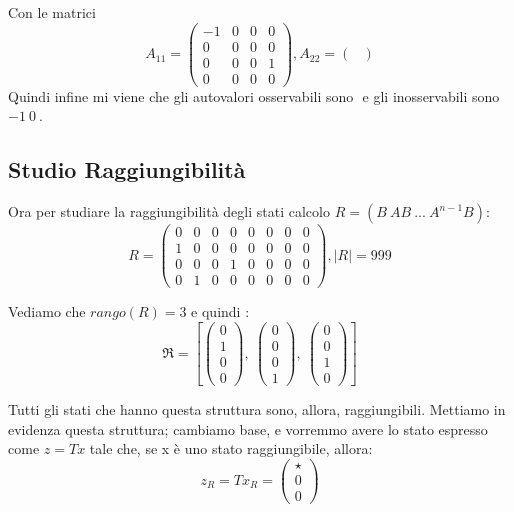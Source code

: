 \documentclass{article}
\begin{document}
Con le matrici \[ A_{11} = \left(\begin{matrix}-1 & 0 & 0 & 0\\0 & 0 & 0 & 0\\0 & 0 & 0 & 1\\0 & 0 & 0 & 0\end{matrix}\right) , A_{22} = \left(\begin{matrix}\end{matrix}\right) \]Quindi infine mi viene che gli autovalori osservabili sono $  $ e gli inosservabili sono $ -1\ 0\  $.

\subsection{Studio Raggiungibilità}
Ora per studiare la raggiungibilità degli stati calcolo $R = (B\ AB\ ...\ A^{n-1}B)$: \[ R = \left(\begin{matrix}0 & 0 & 0 & 0 & 0 & 0 & 0 & 0\\1 & 0 & 0 & 0 & 0 & 0 & 0 & 0\\0 & 0 & 0 & 1 & 0 & 0 & 0 & 0\\0 & 1 & 0 & 0 & 0 & 0 & 0 & 0\end{matrix}\right), |R| = 999 \] 

Vediamo che $rango(R) = 3$ e quindi : \[ \mathfrak{R} = \left[ \left(\begin{matrix}0\\1\\0\\0\end{matrix}\right), \  \left(\begin{matrix}0\\0\\0\\1\end{matrix}\right), \  \left(\begin{matrix}0\\0\\1\\0\end{matrix}\right)\right] \]

Tutti gli stati che hanno questa struttura sono, allora, raggiungibili. Mettiamo in evidenza questa struttura;
cambiamo base, e vorremmo avere lo stato espresso come $z = Tx$ tale che, se x è uno stato raggiungibile, allora: \[ z_R = T x_R = \begin{pmatrix} \star  \\ 0 \\0\end{pmatrix}\]
\end{document}
